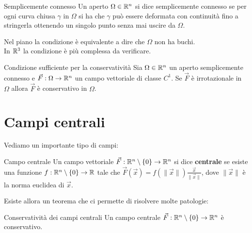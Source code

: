 \begin{definizione}{Semplicemente connesso}
  Un aperto $\Omega \in \mathbb{R}^n$ si dice semplicemente connesso se per ogni curva chiusa $\gamma$ in $\Omega$ si ha che $\gamma$ può essere deformata con continuità fino a stringerla ottenendo un singolo punto senza mai uscire da $\Omega$.
\end{definizione}

Nel piano la condizione è equivalente a dire che $\Omega$ non ha buchi.\\
In $\mathbb{R}^3$ la condizione è più complessa da verificare.\\

\begin{teorema}{Condizione sufficiente per la conservatività}
  Sia $\Omega \in \mathbb{R}^n$ un aperto semplicemente connesso e $\vec F: \Omega \rightarrow \mathbb{R}^n$ un campo vettoriale di classe $C^1$. Se $\vec F$ è irrotazionale in $\Omega$ allora $\vec F$ è conservativo in $\Omega$.
\end{teorema}

\section{Campi centrali}
Vediamo un importante tipo di campi:

\begin{definizione}{Campo centrale}
  Un campo vettoriale $\vec F: \mathbb{R}^n \setminus \{0\} \rightarrow \mathbb{R}^n$ si dice \textbf{centrale} se esiste una funzione $f: \mathbb{R}^n \setminus \{0\} \rightarrow \mathbb{R}$ tale che $\vec F(\vec{x}) = f(\|\vec{x}\|) \frac{\vec{x}}{\|\vec{x}\|}$, dove $\|\vec{x}\|$ è la norma euclidea di $\vec{x}$.
\end{definizione}


Esiste allora un teorema che ci permette di risolvere molte patologie:
\begin{teorema}{Conservatività dei campi centrali}
  Un campo centrale $\vec F: \mathbb{R}^n \setminus \{0\} \rightarrow \mathbb{R}^n$ è conservativo.
\end{teorema}

